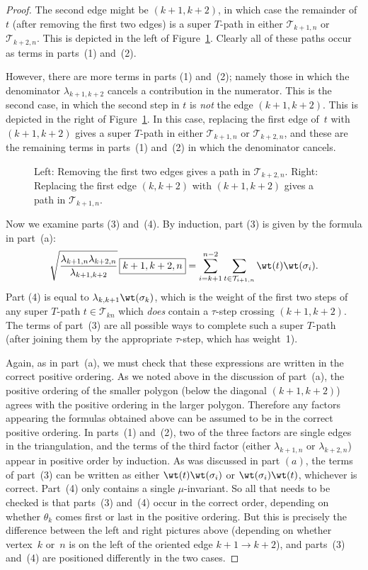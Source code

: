 \begin{proof}
 The second edge might be $(k+1,k+2)$, in which case the remainder of $t$ (after removing the first two edges) is a super $T$-path
 in either $\mathcal{T}_{k+1,n}$ or $\mathcal{T}_{k+2,n}$. This is depicted in the left of Figure~\ref{fig:zigzag_cases}.
 Clearly all of these paths occur as terms in parts~(1) and~(2).

 However, there are more terms in parts (1) and~(2);
 namely those in which the denominator $\lambda_{k+1,k+2}$ cancels a contribution in the numerator. This is the
 second case, in which the second step in $t$ is \emph{not} the edge $(k+1,k+2)$. This is depicted in the right of Figure~\ref{fig:zigzag_cases}.
 In this case, replacing the first edge of~$t$ with $(k+1,k+2)$ gives
 a super $T$-path in either $\mathcal{T}_{k+1,n}$ or $\mathcal{T}_{k+2,n}$, and these are the remaining terms in parts~(1) and~(2) in which the denominator cancels.

 \begin{figure}[h]\centering
 
 \caption{{Left:} Removing the first two edges gives a path in $\mathcal{T}_{k+2,n}$.
 {Right:} Replacing the first edge $(k,k+2)$ with $(k+1,k+2)$ gives a path in $\mathcal{T}_{k+1,n}$.} \label{fig:zigzag_cases}
 \end{figure}

 Now we examine parts (3) and~(4). By induction, part (3) is given by the formula in part~(a):
 \[
 \sqrt{\frac{\lambda_{k+1,n} \lambda_{k+2,n}}{\lambda_{k+1,k+2}}}\, \boxed{k+1,k+2,n}
 = \sum_{i=k+1}^{n-2} \sum_{t \in \mathcal{T}_{i+1,n}} \wt(t) \wt(\sigma_i).
 \]
 Part (4) is equal to $\lambda_{k,k+1} \wt(\sigma_k)$, which is the weight of the first two steps of any super $T$-path $t \in \mathcal{T}_{kn}$ which \emph{does}
 contain a $\tau$-step crossing $(k+1,k+2)$. The terms of part~(3) are all possible ways to complete such a super $T$-path (after joining them by
 the appropriate $\tau$-step, which has weight~1).

 Again, as in part~(a), we must check that these expressions are written in the correct positive ordering. As we noted above
 in the discussion of part~(a), the positive ordering of the smaller polygon (below the diagonal $(k+1,k+2)$) agrees with
 the positive ordering in the larger polygon. Therefore any factors appearing the formulas obtained above can be assumed to be in
 the correct positive ordering. In parts~(1) and~(2), two of the three factors are single edges in the triangulation, and the terms of the third factor
 (either $\lambda_{k+1,n}$ or $\lambda_{k+2,n}$) appear in positive order by induction. As was discussed in part $(a)$, the terms of
 part~(3) can be written as either $\wt(t)\wt(\sigma_i)$ or $\wt(\sigma_i)\wt(t)$, whichever is correct. Part~(4) only contains a single $\mu$-invariant.
 So all that needs to be checked is that parts~(3) and~(4) occur in the correct order, depending on whether $\theta_k$ comes first or last
 in the positive ordering. But this is precisely the difference between the left and right pictures above (depending on whether vertex~$k$ or~$n$ is on the left of the oriented edge $k+1 \to k+2$), and parts~(3) and~(4) are positioned differently in the two cases.
\end{proof}

